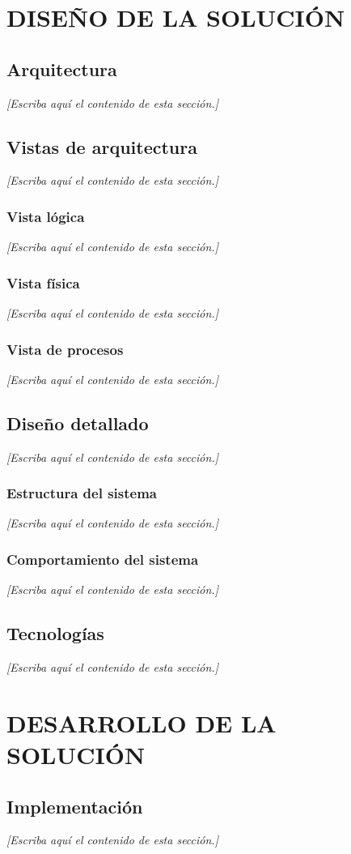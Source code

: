 \documentclass[12pt,letterpaper,oneside]{article}
\newcommand{\pendiente}[1][Escriba aquí el contenido de esta sección.]{%
  {\color{gray!75}\itshape [#1]}\par}
\newcommand{\capitulo}[1]{\clearpage\section{#1}}
\begin{document}
\capitulo{DISEÑO DE LA SOLUCIÓN}

\subsection{Arquitectura}
\pendiente

\subsection{Vistas de arquitectura}
\pendiente

\subsubsection{Vista lógica}
\pendiente

\subsubsection{Vista física}
\pendiente

\subsubsection{Vista de procesos}
\pendiente

\subsection{Diseño detallado}
\pendiente

\subsubsection{Estructura del sistema}
\pendiente

\subsubsection{Comportamiento del sistema}
\pendiente

\subsection{Tecnologías}
\pendiente

\capitulo{DESARROLLO DE LA SOLUCIÓN}

\subsection{Implementación}
\pendiente
\end{document}
